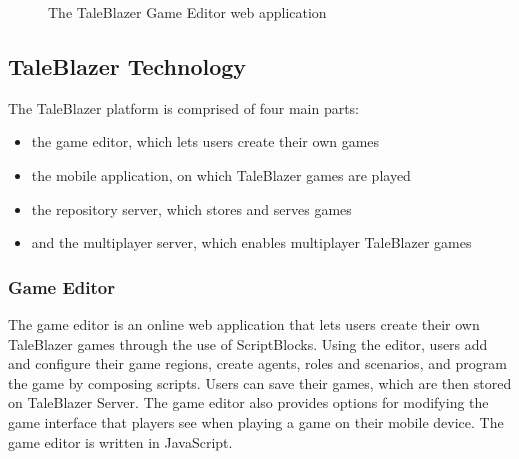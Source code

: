 \medskip
\begin{figure}[hbt]
	\caption[TaleBlazer Game Editor]{\label{fig:game_editor} The TaleBlazer Game Editor web application}
\end{figure}
\pagebreak

\subsection{TaleBlazer Technology}

The TaleBlazer platform is comprised of four main parts:
	\begin{itemize}
 		\item the game editor, which lets users create their own games
 		\item the mobile application, on which TaleBlazer games are played
 		\item the repository server, which stores and serves games
 		\item and the multiplayer server, which enables multiplayer TaleBlazer games
 	\end{itemize}

\subsubsection{Game Editor}
The game editor is an online web application that lets users create their own TaleBlazer games through the use of ScriptBlocks. Using the editor, users add and configure their game regions, create agents, roles and scenarios, and program the game by composing scripts. Users can save their games, which are then stored on TaleBlazer Server. The game editor also provides options for modifying the game interface that players see when playing a game on their mobile device. The game editor is written in JavaScript. 

